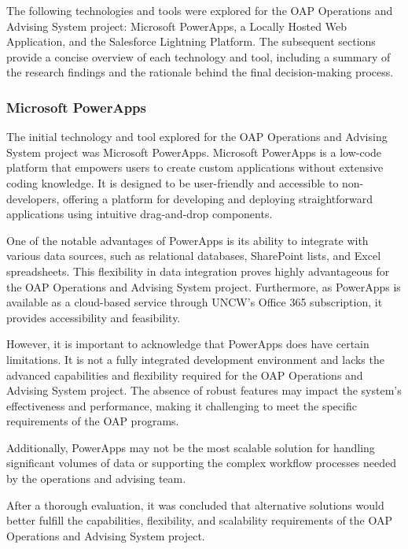 \documentclass[12pt]{article}
\begin{document}
The following technologies and tools were explored for the OAP Operations and Advising System project: Microsoft PowerApps, a Locally Hosted Web Application, and the Salesforce Lightning Platform. The subsequent sections provide a concise overview of each technology and tool, including a summary of the research findings and the rationale behind the final decision-making process.

\subsubsection{Microsoft PowerApps} 
The initial technology and tool explored for the OAP Operations and Advising System project was Microsoft PowerApps. Microsoft PowerApps is a low-code platform that empowers users to create custom applications without extensive coding knowledge. It is designed to be user-friendly and accessible to non-developers, offering a platform for developing and deploying straightforward applications using intuitive drag-and-drop components.

One of the notable advantages of PowerApps is its ability to integrate with various data sources, such as relational databases, SharePoint lists, and Excel spreadsheets. This flexibility in data integration proves highly advantageous for the OAP Operations and Advising System project. Furthermore, as PowerApps is available as a cloud-based service through UNCW's Office 365 subscription, it provides accessibility and feasibility.

However, it is important to acknowledge that PowerApps does have certain limitations. It is not a fully integrated development environment and lacks the advanced capabilities and flexibility required for the OAP Operations and Advising System project. The absence of robust features may impact the system's effectiveness and performance, making it challenging to meet the specific requirements of the OAP programs.

Additionally, PowerApps may not be the most scalable solution for handling significant volumes of data or supporting the complex workflow processes needed by the operations and advising team.

After a thorough evaluation, it was concluded that alternative solutions would better fulfill the capabilities, flexibility, and scalability requirements of the OAP Operations and Advising System project.
\end{document}
